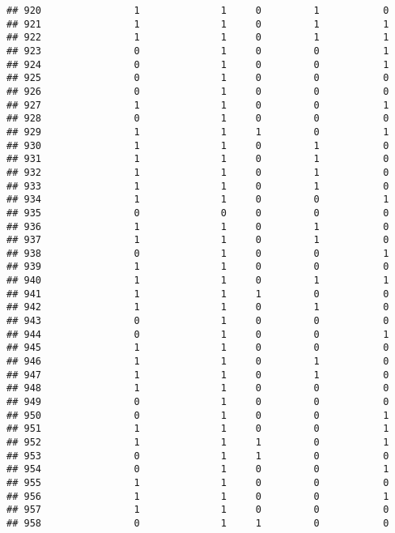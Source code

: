 \documentclass[]{article}
\begin{document}
\begin{verbatim}
## 920                1              1     0         1           0
## 921                1              1     0         1           1
## 922                1              1     0         1           1
## 923                0              1     0         0           1
## 924                0              1     0         0           1
## 925                0              1     0         0           0
## 926                0              1     0         0           0
## 927                1              1     0         0           1
## 928                0              1     0         0           0
## 929                1              1     1         0           1
## 930                1              1     0         1           0
## 931                1              1     0         1           0
## 932                1              1     0         1           0
## 933                1              1     0         1           0
## 934                1              1     0         0           1
## 935                0              0     0         0           0
## 936                1              1     0         1           0
## 937                1              1     0         1           0
## 938                0              1     0         0           1
## 939                1              1     0         0           0
## 940                1              1     0         1           1
## 941                1              1     1         0           0
## 942                1              1     0         1           0
## 943                0              1     0         0           0
## 944                0              1     0         0           1
## 945                1              1     0         0           0
## 946                1              1     0         1           0
## 947                1              1     0         1           0
## 948                1              1     0         0           0
## 949                0              1     0         0           0
## 950                0              1     0         0           1
## 951                1              1     0         0           1
## 952                1              1     1         0           1
## 953                0              1     1         0           0
## 954                0              1     0         0           1
## 955                1              1     0         0           0
## 956                1              1     0         0           1
## 957                1              1     0         0           0
## 958                0              1     1         0           0

\end{verbatim}
\end{document}
